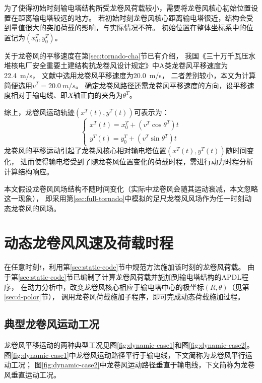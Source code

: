 为了使得初始时刻输电塔结构所受龙卷风荷载较小，需要将龙卷风核心初始位置设置在距离输电塔较远的地方。
若初始时刻龙卷风核心距离输电塔很近，结构会受到量值很大的突加荷载的影响，与实际情况不符。
初始位置在整体坐标系中的位置记为$\left(x^T_{0},y^T_{0}\right)$。

关于龙卷风的平移速度在第\ref{sec:tornado-cha}节已有介绍，
我国《三十万千瓦压水堆核电厂安全重要土建结构抗龙卷风设计规定》中A类龙卷风平移速度为\SI{22.4}{m/s}，
文献\cite{savory2001modelling}\cite{hamada2011behaviour}中选用龙卷风平移速度为\SI{20.0}{m/s}，
二者差别较小，本文为计算简便选用$v^T=\SI{20.0}{m/s}$。
确定龙卷风路径还需龙卷风平移速度的方向，设平移速度相对于输电线、即$X$轴正向的夹角为$\theta^T$。

综上，龙卷风运动轨迹$\left(x^T(t),y^T(t)\right)$可表示为：
\begin{equation}
	\begin{cases}
		x^T(t) = x^T_0 + \left(v^T\cos{\theta^T}\right)t \\
		y^T(t) = y^T_0 + \left(v^T\sin{\theta^T}\right)t 
	\end{cases}
\end{equation}
龙卷风的平移运动引起了龙卷风核心相对输电塔位置$\left(x^T(t),y^T(t)\right)$随时间变化，
进而使得输电塔受到了随龙卷风位置变化的荷载时程，需进行动力时程分析计算结构响应。

本文假设龙卷风风场结构不随时间变化（实际中龙卷风会随其运动衰减，本文忽略这一现象），
即采用第\ref{sec:full-tornado}中模拟的足尺龙卷风风场作为任一时刻动态龙卷风的风场。

\section{动态龙卷风风速及荷载时程}
在任意时刻$t$，利用第\ref{sec:static-code}节中规范方法施加该时刻的龙卷风荷载。
由于第\ref{sec:static-code}节已编制了计算龙卷风荷载并施加到输电塔结构的APDL程序，
在动力分析中，改变龙卷风核心相应于输电塔中心的极坐标$(R,\theta)$（见第\ref{sec:d-polor}节），
调用龙卷风荷载施加子程序，即可完成动态荷载施加过程。

\subsection{典型龙卷风运动工况}
龙卷风平移运动的两种典型工况见图\ref{fig:dynamic-case1}和图\ref{fig:dynamic-case2}。
图\ref{fig:dynamic-case1}中龙卷风运动路径平行于输电线，下文简称为龙卷风平行运动工况；
图\ref{fig:dynamic-case2}中龙卷风运动路径垂直于输电线，下文简称为龙卷风垂直运动工况。

